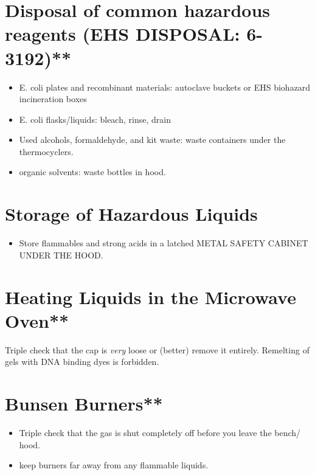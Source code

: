 \documentclass[
]{book}
\providecommand{\tightlist}{%
  \setlength{\itemsep}{0pt}\setlength{\parskip}{0pt}}
\begin{document}
\hypertarget{disposal-of-common-hazardous-reagents-ehs-disposal-6-3192}{%
\section{Disposal of common hazardous reagents (EHS DISPOSAL: 6-3192)**}\label{disposal-of-common-hazardous-reagents-ehs-disposal-6-3192}}

\begin{itemize}
\item
  E. coli plates and recombinant materials: autoclave buckets or EHS biohazard incineration boxes
\item
  E. coli flasks/liquids: bleach, rinse, drain
\item
  Used alcohols, formaldehyde, and kit waste: waste containers under the thermocyclers.
\item
  organic solvents: waste bottles in hood.
\end{itemize}

\hypertarget{storage-of-hazardous-liquids}{%
\section{\texorpdfstring{Storage \textbf{of Hazardous Liquids}}{Storage of Hazardous Liquids}}\label{storage-of-hazardous-liquids}}

\begin{itemize}
\tightlist
\item
  Store flammables and strong acids in a latched METAL SAFETY CABINET UNDER THE HOOD.
\end{itemize}

\hypertarget{heating-liquids-in-the-microwave-oven}{%
\section{Heating Liquids in the Microwave Oven**}\label{heating-liquids-in-the-microwave-oven}}

Triple check that the cap is \emph{very} loose or (better) remove it entirely. Remelting of gels with DNA binding dyes is forbidden.

\hypertarget{bunsen-burners}{%
\section{Bunsen Burners**}\label{bunsen-burners}}

\begin{itemize}
\item
  Triple check that the gas is shut completely off before you leave the bench/ hood.
\item
  keep burners far away from any flammable liquids.
\end{itemize}
\end{document}
